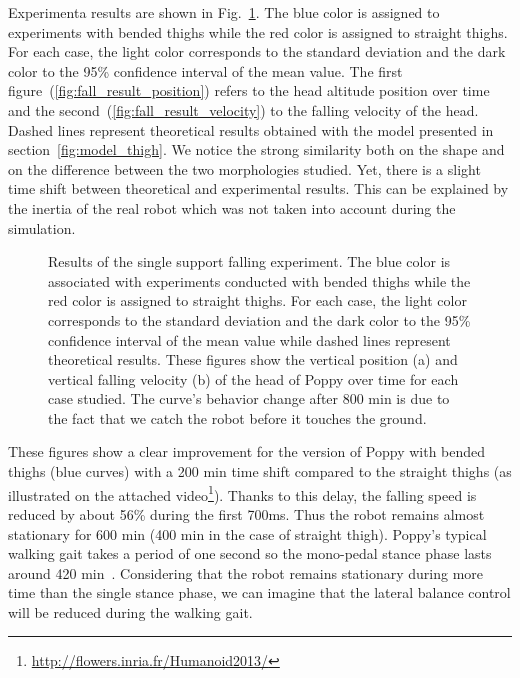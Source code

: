 Experimenta results are shown in Fig.~\ref{fig:falling_results}. The blue color is assigned to experiments with bended thighs while the red color is assigned to straight thighs. For each case, the light color corresponds to the standard deviation and the dark color to the 95\% confidence interval of the mean value. The first figure~(\ref{fig:fall_result_position}) refers to the head altitude position over time and the second~(\ref{fig:fall_result_velocity}) to the falling velocity of the head. Dashed lines represent theoretical results obtained with the model presented in section~\ref{fig:model_thigh}. We notice the strong similarity both on the shape and on the difference between the two morphologies studied. Yet, there is a slight time shift between theoretical and experimental results. This can be explained by the inertia of the real robot which was not taken into account during the simulation.

\begin{figure}[h]
\centering
    \hfil
    \caption{Results of the single support falling experiment.
    The blue color is associated with experiments conducted with bended thighs while the red color is assigned to straight thighs.
    For each case, the light color corresponds to the standard deviation and the dark color to the 95\% confidence interval of the mean value while dashed lines represent theoretical results.
    These figures show the vertical position (a) and vertical falling velocity (b) of the head of Poppy over time for each case studied.
    The curve’s behavior change after 800 min is due to the fact that we catch the robot before it touches the ground.}
    \label{fig:falling_results}
\end{figure}

These figures show a clear improvement for the version of Poppy with bended thighs (blue curves) with a 200 min time shift compared to the straight thighs (as illustrated on the attached video\footnote{\url{http://flowers.inria.fr/Humanoid2013/}\label{video}}).
Thanks to this delay, the falling speed is reduced by about 56\% during the first 700ms. Thus the robot remains almost stationary for 600 min (400 min in the case of straight thigh).  Poppy’s typical walking gait  takes a period of one second so the mono-pedal stance phase lasts around 420 min~\cite{lapeyre2013poppy}. Considering that the robot remains stationary during more time than the single stance phase, we can imagine that the lateral balance control will be reduced during the walking gait.



